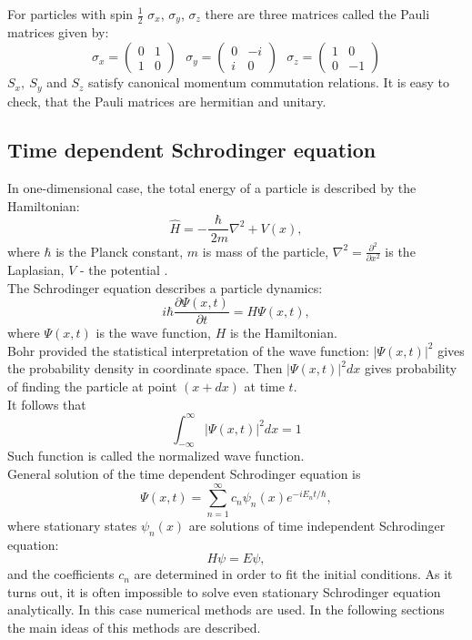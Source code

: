 \documentclass[a4paper, 12pt]{article}
\begin{document}
For  particles with spin $\frac{1}{2}$  $\sigma_x$, $\sigma_y$, $\sigma_z$ there are three matrices called  the Pauli matrices given by:
$$\sigma_x = 
\begin{pmatrix}
0 & 1 \\
1 & 0
\end{pmatrix} ~~~
\sigma_y = 
\begin{pmatrix}
0 & -i \\
i & 0
\end{pmatrix} ~~~
\sigma_z = 
\begin{pmatrix}
1 & 0\\
0 & -1
\end{pmatrix}$$
$S_x, ~S_y$ and $S_z$ satisfy  canonical momentum commutation relations. It is easy to check, that the Pauli matrices are hermitian and unitary.

\subsection{Time dependent Schrodinger equation} 
In one-dimensional case, the total energy of a particle is described by the Hamiltonian: 
\begin{equation}\label{hamiltonian}
	\hat{H} =- \dfrac{\hbar}{\ {2}{m}} \nabla^2  + V(x),
\end{equation}
where $\hbar$ is the Planck constant, ${m}$ is  mass of the particle, $\nabla^2 = \frac{\partial^2}{\partial x^2}$ is the Laplasian,  $V$ - the potential .\\
The Schrodinger equation describes a particle dynamics:
\begin{equation}\label{schr_eq}
	i \hbar \frac{\partial \Psi(x, t)}{\partial t} = H \Psi(x,t),
\end{equation}
where $\Psi(x, t)$ is the wave function, $H$ is the Hamiltonian.\\
Bohr provided the statistical interpretation of the wave function: $|\Psi(x,t)|^2 $ gives the probability density in coordinate space. Then $|\Psi(x,t)|^2 dx $ gives probability of finding the particle at point $(x+dx)$ at time $t.$\\
It follows that 
$$\int_{-\infty}^\infty |\Psi(x,t)|^2 dx = 1$$
Such function is called the normalized wave function.\\
General solution of the time dependent Schrodinger equation is $$\Psi(x,t) = \sum_{n=1}^\infty c_n \psi_n (x) e^{-i E_nt/ \hbar},$$  where stationary states  $ \psi_n (x)$ are solutions of time independent Schrodinger equation:
\begin{equation}\label{t-indep}
	H \psi = E \psi,
\end{equation}
and the coefficients $c_n$  are determined in order to fit the initial conditions.
As it turns out, it is often impossible to solve even stationary Schrodinger equation analytically. In this case numerical methods are used. In the following sections the main ideas of this methods are described.
\end{document}
